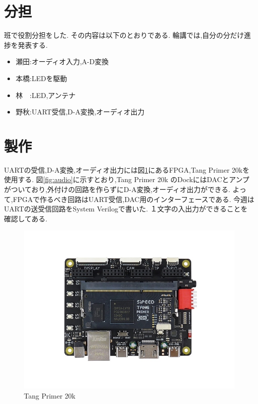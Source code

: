 \documentclass[a4paper,12pt]{article}
\begin{document}
\begin{multicols}{2}
\section{分担}
班で役割分担をした.
その内容は以下のとおりである.
輪講では,自分の分だけ進捗を発表する.

\begin{itemize}
\item
  瀬田:オーディオ入力,A-D変換
\item
  本橋:LEDを駆動
\item
  林　:LED,アンテナ
\item
  野秋:UART受信,D-A変換,オーディオ出力
\end{itemize}

\section{製作}
UARTの受信,D-A変換,オーディオ出力には図\ref{fig:fpga}にあるFPGA,Tang Primer 20kを使用する.
図\ref{fig:audio}に示すとおり,Tang Primer 20k のDockにはDACとアンプがついており,外付けの回路を作らずにD-A変換,オーディオ出力ができる.
よって,FPGAで作るべき回路はUART受信,DAC用のインターフェースである.
今週はUARTの送受信回路をSystem Verilogで書いた.
１文字の入出力ができることを確認してある.

\begin{figure}[H] %
  \centering
  \includegraphics[width=\linewidth]{fpga.jpg}
  \caption{Tang Primer 20k}
  \label{fig:fpga}
\end{figure}

\end{multicols}
\end{document}
